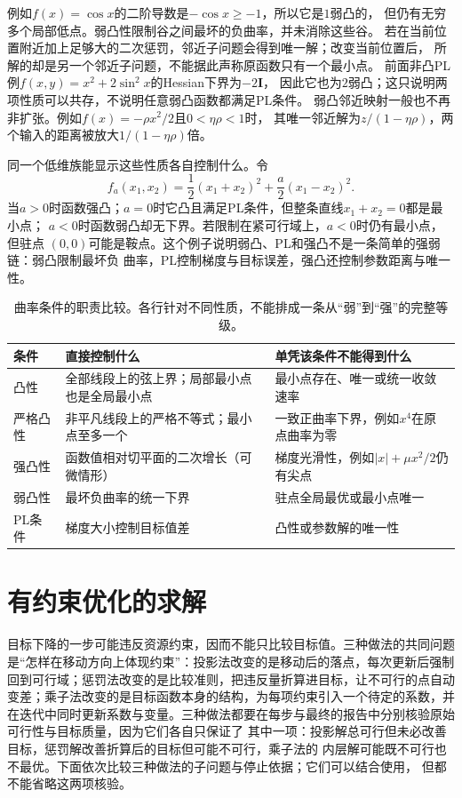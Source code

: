 例如$f(x)=\cos x$的二阶导数是$-\cos x\geq-1$，所以它是$1$弱凸的，
但仍有无穷多个局部低点。弱凸性限制谷之间最坏的负曲率，并未消除这些谷。
若在当前位置附近加上足够大的二次惩罚，邻近子问题会得到唯一解；改变当前位置后，
所解的却是另一个邻近子问题，不能据此声称原函数只有一个最小点。
前面非凸PL例$f(x,y)=x^2+2\sin^2x$的Hessian下界为$-2\bm I$，
因此它也为$2$弱凸；这只说明两项性质可以共存，不说明任意弱凸函数都满足PL条件。
弱凸邻近映射一般也不再非扩张。例如$f(x)=-\rho x^2/2$且$0<\eta\rho<1$时，
其唯一邻近解为$z/(1-\eta\rho)$，两个输入的距离被放大$1/(1-\eta\rho)$倍。

同一个低维族能显示这些性质各自控制什么。令
\[
  f_a(x_1,x_2)=\frac12(x_1+x_2)^2+\frac{a}{2}(x_1-x_2)^2.
\]
当$a>0$时函数强凸；$a=0$时它凸且满足PL条件，但整条直线$x_1+x_2=0$都是最小点；
$a<0$时函数弱凸却无下界。若限制在紧可行域上，$a<0$时仍有最小点，但驻点
$(0,0)$可能是鞍点。这个例子说明弱凸、PL和强凸不是一条简单的强弱链：弱凸限制最坏负
曲率，PL控制梯度与目标误差，强凸还控制参数距离与唯一性。

\begin{table}[htbp]
 \centering\small
 \begin{tabularx}{\linewidth}{@{}lXX@{}}
 \toprule
 条件 & 直接控制什么 & 单凭该条件不能得到什么\\
 \midrule
 凸性 & 全部线段上的弦上界；局部最小点也是全局最小点 & 最小点存在、唯一或统一收敛速率\\
 严格凸性 & 非平凡线段上的严格不等式；最小点至多一个 & 一致正曲率下界，例如$x^4$在原点曲率为零\\
 强凸性 & 函数值相对切平面的二次增长（可微情形） & 梯度光滑性，例如$|x|+\mu x^2/2$仍有尖点\\
 弱凸性 & 最坏负曲率的统一下界 & 驻点全局最优或最小点唯一\\
 PL条件 & 梯度大小控制目标值差 & 凸性或参数解的唯一性\\
 \bottomrule
 \end{tabularx}
 \caption{曲率条件的职责比较。各行针对不同性质，不能排成一条从“弱”到“强”的完整等级。}
 \label{tab:opt-curvature-conditions}
\end{table}

\section{有约束优化的求解}
\label{sec:opt-constraints-duality-certificates}

目标下降的一步可能违反资源约束，因而不能只比较目标值。三种做法的共同问题是“怎样在移动方向上体现约束”：投影法改变的是移动后的落点，每次更新后强制回到可行域；惩罚法改变的是比较准则，把违反量折算进目标，让不可行的点自动变差；乘子法改变的是目标函数本身的结构，为每项约束引入一个待定的系数，并在迭代中同时更新系数与变量。三种做法都要在每步与最终的报告中分别核验原始可行性与目标质量，因为它们各自只保证了
其中一项：投影解总可行但未必改善目标，惩罚解改善折算后的目标但可能不可行，乘子法的
内层解可能既不可行也不最优。下面依次比较三种做法的子问题与停止依据；它们可以结合使用，
但都不能省略这两项核验。

